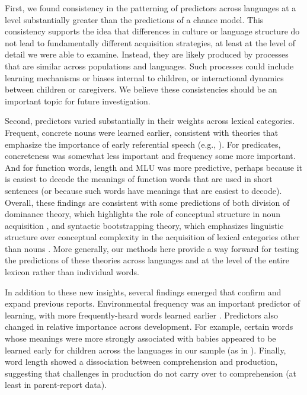 \documentclass[manuscript]{stjour}
\begin{document}
First, we found consistency in the patterning of predictors across
languages at a level substantially greater than the predictions of a
chance model. This consistency supports the idea that differences in
culture or language structure do not lead to fundamentally different
acquisition strategies, at least at the level of detail we were able to
examine. Instead, they are likely produced by processes that are similar
across populations and languages. Such processes could include learning
mechanisms or biases internal to children, or interactional dynamics
between children or caregivers. We believe these consistencies should be
an important topic for future investigation.

Second, predictors varied substantially in their weights across lexical
categories. Frequent, concrete nouns were learned earlier, consistent
with theories that emphasize the importance of early referential speech
(e.g., \citealp{baldwin1995}). For predicates, concreteness was somewhat
less important and frequency some more important. And for function
words, length and MLU was more predictive, perhaps because it is easiest
to decode the meanings of function words that are used in short
sentences (or because such words have meanings that are easiest to
decode). Overall, these findings are consistent with some predictions of
both division of dominance theory, which highlights the role of
conceptual structure in noun acquisition \citep{gentner2001}, and
syntactic bootstrapping theory, which emphasizes linguistic structure
over conceptual complexity in the acquisition of lexical categories
other than nouns \citep{snedeker2007}. More generally, our methods here
provide a way forward for testing the predictions of these theories
across languages and at the level of the entire lexicon rather than
individual words.

In addition to these new insights, several findings emerged that confirm
and expand previous reports. Environmental frequency was an important
predictor of learning, with more frequently-heard words learned earlier
\citep{goodman2008,swingley2017}. Predictors also changed in relative
importance across development. For example, certain words whose meanings
were more strongly associated with babies appeared to be learned early
for children across the languages in our sample (as in
\citealp{tardif2008}). Finally, word length showed a dissociation
between comprehension and production, suggesting that challenges in
production do not carry over to comprehension (at least in parent-report
data).
\end{document}
